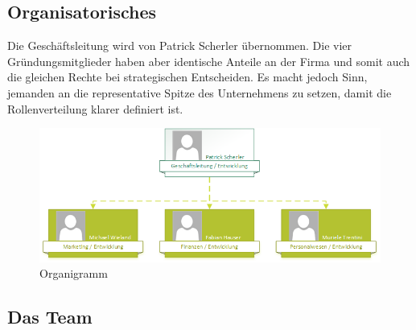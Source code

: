 \subsection{Organisatorisches}
Die Geschäftsleitung wird von Patrick Scherler übernommen. Die vier Gründungsmitglieder haben aber identische Anteile an der Firma und somit auch die gleichen Rechte bei strategischen Entscheiden. Es macht jedoch Sinn, jemanden an die representative Spitze des Unternehmens zu setzen, damit die Rollenverteilung klarer definiert ist.
\begin{figure}[h]
	\centering
	\includegraphics[width=0.9\linewidth]{images/organigramm}
	\caption{Organigramm}
	\label{fig:organigramm}
\end{figure}

\clearpage

\subsection{Das Team}

